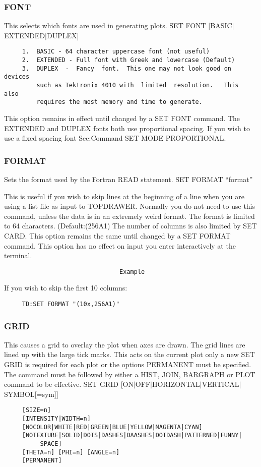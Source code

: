 \subsubsection{FONT}
This selects which fonts are used in generating plots.  
SET FONT [BASIC$|$EXTENDED$|$DUPLEX] 
\begin{verbatim}
     1.  BASIC - 64 character uppercase font (not useful) 
     2.  EXTENDED - Full font with Greek and lowercase (Default) 
     3.  DUPLEX  -  Fancy  font.  This one may not look good on devices
         such as Tektronix 4010 with  limited  resolution.   This  also
         requires the most memory and time to generate.  
\end{verbatim}

This option remains in effect until changed by a SET FONT command.  The
EXTENDED and DUPLEX fonts both use proportional spacing.  If  you  wish
to use a fixed spacing font See:Command SET MODE PROPORTIONAL.  
\subsubsection{FORMAT}
Sets the format used by the Fortran READ statement.  
SET FORMAT ``format'' 

This  is  useful  if  you wish to skip lines at the beginning of a line
when you are using a list file as input to TOPDRAWER.  Normally you  do
not  need to use this command, unless the data is in an extremely weird
format.  The format is limited to 64 characters.  (Default:(256A1)  The
number of columns is also limited by SET CARD.  This option remains the
same until changed by a SET FORMAT command.  This option has no  effect
on input you enter interactively at the terminal.  
\begin{verbatim}
                                Example
\end{verbatim}
If you wish to skip the first 10 columns:  
\begin{verbatim}
     TD:SET FORMAT "(10x,256A1)" 
\end{verbatim}
\subsubsection{GRID}
This  causes  a grid to overlay the plot when axes are drawn.  The grid
lines are lined up with the large tick marks.  This acts on the current
plot  only  a  new  SET  GRID  is required for each plot or the options
PERMANENT must be specified.  The command must be followed by either  a
HIST, JOIN, BARGRAPH or PLOT command to be effective.  
SET GRID [ON$|$OFF$|$HORIZONTAL$|$VERTICAL$|$SYMBOL[=sym]] 
\begin{verbatim}
     [SIZE=n] 
     [INTENSITY|WIDTH=n] 
     [NOCOLOR|WHITE|RED|GREEN|BLUE|YELLOW|MAGENTA|CYAN] 
     [NOTEXTURE|SOLID|DOTS|DASHES|DAASHES|DOTDASH|PATTERNED|FUNNY|
          SPACE] 
     [THETA=n] [PHI=n] [ANGLE=n] 
     [PERMANENT] 
\end{verbatim}
